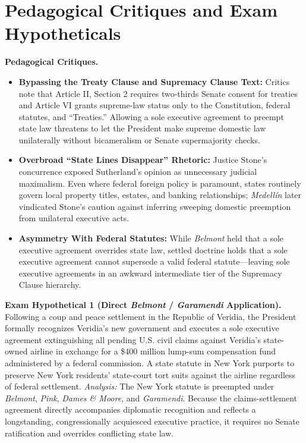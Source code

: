 \documentclass[12pt]{article}
\begin{document}
\section{Pedagogical Critiques and Exam Hypotheticals}

\textbf{Pedagogical Critiques.}
\begin{itemize}
  \item \textbf{Bypassing the Treaty Clause and Supremacy Clause Text:} Critics note that Article II, Section 2 requires two-thirds Senate consent for treaties and Article VI grants supreme-law status only to the Constitution, federal statutes, and ``Treaties.'' Allowing a sole executive agreement to preempt state law threatens to let the President make supreme domestic law unilaterally without bicameralism or Senate supermajority checks.
  \item \textbf{Overbroad ``State Lines Disappear'' Rhetoric:} Justice Stone's concurrence exposed Sutherland's opinion as unnecessary judicial maximalism. Even where federal foreign policy is paramount, states routinely govern local property titles, estates, and banking relationships; \textit{Medell\'in} later vindicated Stone's caution against inferring sweeping domestic preemption from unilateral executive acts.
  \item \textbf{Asymmetry With Federal Statutes:} While \textit{Belmont} held that a sole executive agreement overrides state law, settled doctrine holds that a sole executive agreement cannot supersede a valid federal statute---leaving sole executive agreements in an awkward intermediate tier of the Supremacy Clause hierarchy.
\end{itemize}

\textbf{Exam Hypothetical 1 (Direct \textit{Belmont} / \textit{Garamendi} Application).} Following a coup and peace settlement in the Republic of Veridia, the President formally recognizes Veridia's new government and executes a sole executive agreement extinguishing all pending U.S. civil claims against Veridia's state-owned airline in exchange for a \$400 million lump-sum compensation fund administered by a federal commission. A state statute in New York purports to preserve New York residents' state-court tort suits against the airline regardless of federal settlement. \textit{Analysis:} The New York statute is preempted under \textit{Belmont}, \textit{Pink}, \textit{Dames \& Moore}, and \textit{Garamendi}. Because the claims-settlement agreement directly accompanies diplomatic recognition and reflects a longstanding, congressionally acquiesced executive practice, it requires no Senate ratification and overrides conflicting state law.
\end{document}
